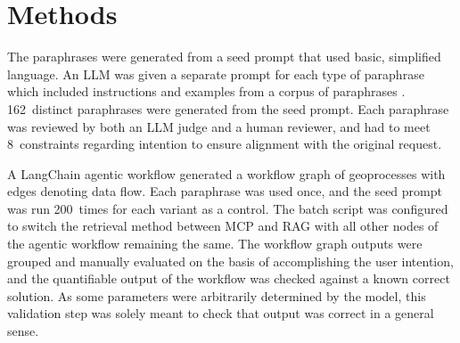 \section{Methods}
\label{sec:methods}

The paraphrases were generated from a seed prompt that used basic, simplified language. An LLM
was given a separate prompt for each type of paraphrase which included instructions and examples
from a corpus of paraphrases \citep{kovatchev2018}. 162~distinct paraphrases were generated from
the seed prompt. Each paraphrase was reviewed by both an LLM judge and a human reviewer, and had
to meet 8~constraints regarding intention to ensure alignment with the original request.

A LangChain agentic workflow generated a workflow graph of geoprocesses with edges denoting data
flow. Each paraphrase was used once, and the seed prompt was run 200~times for each variant as a
control. The batch script was configured to switch the retrieval method between MCP and RAG with
all other nodes of the agentic workflow remaining the same. The workflow graph outputs were
grouped and manually evaluated on the basis of accomplishing the user intention, and the
quantifiable output of the workflow was checked against a known correct solution. As some
parameters were arbitrarily determined by the model, this validation step was solely meant to
check that output was correct in a general sense.
